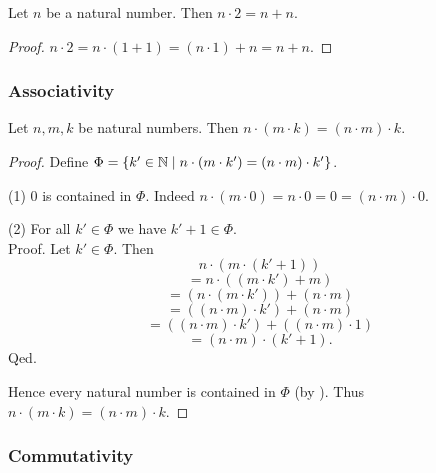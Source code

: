 \documentclass[10pt]{article}
\begin{document}
  \begin{forthel}
    \begin{corollary}[id=ARITHMETIC_06_5679541582299136,printid]
      Let $n$ be a natural number.
      Then $n \cdot 2 = n + n$.
    \end{corollary}
    \begin{proof}
      $n \cdot 2
        = n \cdot (1 + 1)
        = (n \cdot 1) + n
        = n + n$.
    \end{proof}
  \end{forthel}


  \subsubsection*{Associativity}

  \begin{forthel}
    \begin{proposition}[id=ARITHMETIC_06_347295585402880,printid]
      Let $n, m, k$ be natural numbers.
      Then $n \cdot (m \cdot k) = (n \cdot m) \cdot k$.
    \end{proposition}
    \begin{proof}
      Define $\Phi = \{ k' \in \mathbb{N} \mid n \cdot (m \cdot k') = (n \cdot m) \cdot k' \}$.

      (1) $0$ is contained in $\Phi$.
      Indeed $n \cdot (m \cdot 0)
        = n \cdot 0
        = 0
        = (n \cdot m) \cdot 0$.

      (2) For all $k' \in \Phi$ we have $k' + 1 \in \Phi$. \\
      Proof.
        Let $k' \in \Phi$.
        Then
        \[  n \cdot (m \cdot (k' + 1))                          \]
        \[    = n \cdot ((m \cdot k') + m)                      \]
        \[    = (n \cdot (m \cdot k')) + (n \cdot m)            \]
        \[    = ((n \cdot m) \cdot k') + (n \cdot m)            \]
        \[    = ((n \cdot m) \cdot k') + ((n \cdot m) \cdot 1)  \]
        \[    = (n \cdot m) \cdot (k' + 1).                     \]
      Qed.

      Hence every natural number is contained in $\Phi$ (by ).
      Thus $n \cdot (m \cdot k) = (n \cdot m) \cdot k$.
    \end{proof}
  \end{forthel}


  \subsubsection*{Commutativity}
\end{document}
